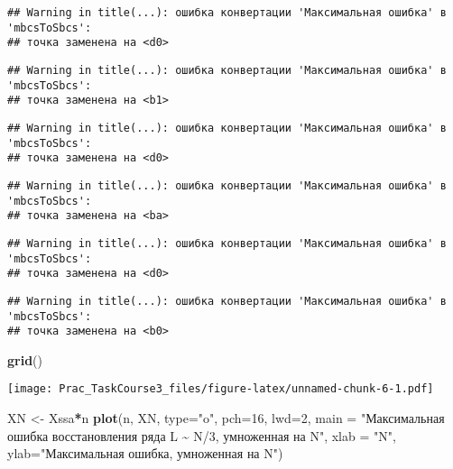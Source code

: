 \documentclass[
]{article}
\newenvironment{Shaded}{\begin{snugshade}}{\end{snugshade}}
\newcommand{\AttributeTok}[1]{\textcolor[rgb]{0.13,0.29,0.53}{#1}}
\newcommand{\DecValTok}[1]{\textcolor[rgb]{0.00,0.00,0.81}{#1}}
\newcommand{\FunctionTok}[1]{\textcolor[rgb]{0.13,0.29,0.53}{\textbf{#1}}}
\newcommand{\NormalTok}[1]{#1}
\newcommand{\OtherTok}[1]{\textcolor[rgb]{0.56,0.35,0.01}{#1}}
\newcommand{\SpecialCharTok}[1]{\textcolor[rgb]{0.81,0.36,0.00}{\textbf{#1}}}
\newcommand{\StringTok}[1]{\textcolor[rgb]{0.31,0.60,0.02}{#1}}
\begin{document}
\begin{verbatim}
## Warning in title(...): ошибка конвертации 'Максимальная ошибка' в 'mbcsToSbcs':
## точка заменена на <d0>
\end{verbatim}

\begin{verbatim}
## Warning in title(...): ошибка конвертации 'Максимальная ошибка' в 'mbcsToSbcs':
## точка заменена на <b1>
\end{verbatim}

\begin{verbatim}
## Warning in title(...): ошибка конвертации 'Максимальная ошибка' в 'mbcsToSbcs':
## точка заменена на <d0>
\end{verbatim}

\begin{verbatim}
## Warning in title(...): ошибка конвертации 'Максимальная ошибка' в 'mbcsToSbcs':
## точка заменена на <ba>
\end{verbatim}

\begin{verbatim}
## Warning in title(...): ошибка конвертации 'Максимальная ошибка' в 'mbcsToSbcs':
## точка заменена на <d0>
\end{verbatim}

\begin{verbatim}
## Warning in title(...): ошибка конвертации 'Максимальная ошибка' в 'mbcsToSbcs':
## точка заменена на <b0>
\end{verbatim}

\begin{Shaded}
\begin{Highlighting}[]
\FunctionTok{grid}\NormalTok{()}
\end{Highlighting}
\end{Shaded}

\texttt{[image: Prac\_TaskCourse3\_files/figure-latex/unnamed-chunk-6-1.pdf]}

\begin{Shaded}
\begin{Highlighting}[]
\NormalTok{XN }\OtherTok{\textless{}{-}}\NormalTok{ Xssa}\SpecialCharTok{*}\NormalTok{n}
\FunctionTok{plot}\NormalTok{(n, XN, }\AttributeTok{type=}\StringTok{"o"}\NormalTok{, }\AttributeTok{pch=}\DecValTok{16}\NormalTok{, }\AttributeTok{lwd=}\DecValTok{2}\NormalTok{, }\AttributeTok{main =} \StringTok{"Максимальная ошибка восстановления ряда L \textasciitilde{} N/3, умноженная на N"}\NormalTok{,}
     \AttributeTok{xlab =} \StringTok{"N"}\NormalTok{, }\AttributeTok{ylab=}\StringTok{"Максимальная ошибка, умноженная на N"}\NormalTok{)}
\end{Highlighting}
\end{Shaded}
\end{document}
